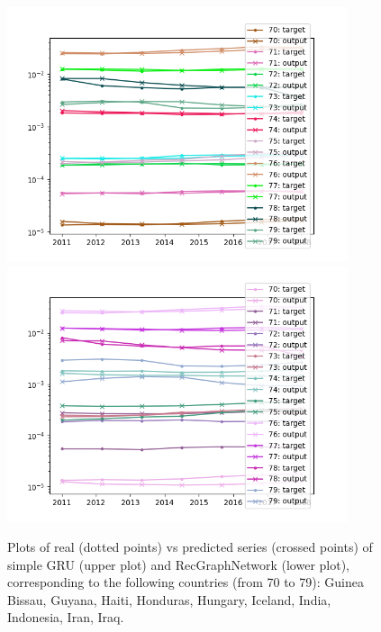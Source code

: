 \documentclass{article}
\begin{document}
\begin{figure}
    \centering
    \includegraphics[width=100mm]{simple_output_7.png}
    \includegraphics[width=100mm]{multi_output_7.png}
    \caption{Plots of real (dotted points) vs predicted series (crossed points) of simple GRU (upper plot) and RecGraphNetwork (lower plot), corresponding to the following countries (from 70 to 79): Guinea Bissau, Guyana, Haiti, Honduras, Hungary, Iceland, India, Indonesia, Iran, Iraq.}
    \label{fig:2}
\end{figure}
\end{document}
